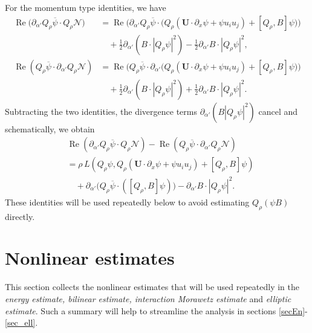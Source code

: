 \documentclass[11pt,letterpaper,reqno]{amsart}
\numberwithin{equation}{section}
\theoremstyle{definition}
\theoremstyle{remark}
\newcommand{\pa}{\partial}
\begin{document}
For the momentum type identities, we have 
 \begin{align}
      \operatorname{Re}\big(\pa_{\alpha'}Q_\rho \overline{\psi}\cdot  Q_\rho \mathcal{N}\big)& = \operatorname{Re}\big( \pa_{\alpha'} Q_\rho \overline{\psi} \cdot  \big(Q_\rho (\mathbf{U} \cdot \partial_x \psi+\psi  u_i u_j)  + [Q_\rho,B]\psi \big) \big)  \nonumber\\
      &\quad + \frac 12\pa_{\alpha'}(B \cdot |Q_\rho \psi|^2) - \frac 12\pa_{\alpha'}B \cdot |Q_\rho \psi|^2,\label{momen_B_1}\\
      \operatorname{Re}(Q_\rho \overline{\psi}\cdot  \pa_{\alpha'}Q_\rho \mathcal{N})& = \operatorname{Re}\big( Q_\rho \overline{\psi} \cdot \pa_{\alpha'}  \big(Q_\rho (\mathbf{U} \cdot \partial_x \psi+\psi  u_i u_j)  + [Q_\rho,B]\psi \big) \big) \nonumber\\
      &\quad +\frac 12 \pa_{\alpha'}(B \cdot |Q_\rho \psi|^2) + \frac 12\pa_{\alpha'}B \cdot |Q_\rho \psi|^2.  \label{momen_B_2}
 \end{align}
Subtracting the two identities, the divergence terms
\(\partial_{\alpha'}(B|Q_\rho\psi|^2)\) cancel and schematically, we obtain
 \begin{equation}\label{momen_B_3}\begin{aligned}
      &\operatorname{Re}(\pa_{\alpha'}Q_\rho \overline{\psi}\cdot  Q_\rho \mathcal{N}) - \operatorname{Re}(Q_\rho \overline{\psi}\cdot  \pa_{\alpha'}Q_\rho \mathcal{N}) \\
      & = \rho\,  L(Q_\rho \psi, Q_\rho (\mathbf{U} \cdot \partial_x \psi+\psi  u_i u_j)+ [Q_\rho , B]\psi )\\
      &\quad  +   \pa_{\alpha'}\big( Q_\rho \overline{\psi} \cdot ([Q_\rho, B]\psi)\big)-\pa_{\alpha'}B\cdot |Q_\rho \psi|^2. 
 \end{aligned}
 \end{equation}
These identities will be used repeatedly below to avoid estimating
$Q_\rho(\psi B)$ directly.






\section{Nonlinear estimates} \label{sec_non_est}

This section collects the nonlinear estimates that will be used repeatedly
in the \textit{energy estimate, bilinear estimate, interaction Morawetz estimate} and \textit{elliptic estimate}.  Such a summary will help to streamline the analysis in sections \ref{secEn}-\ref{sec_ell}.
\end{document}
